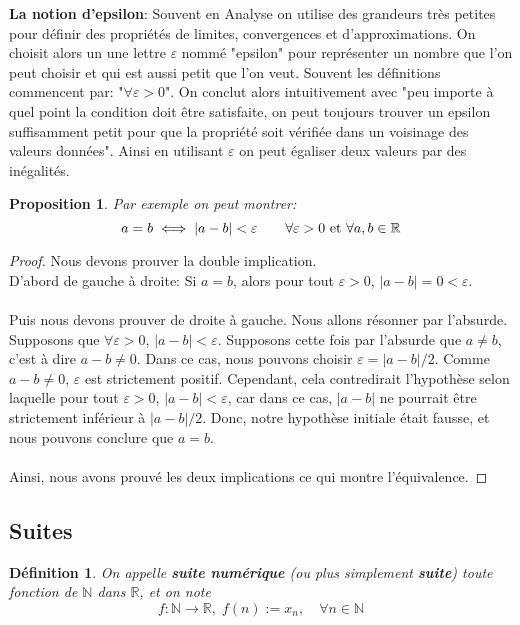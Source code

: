 \documentclass[a4paper, 12pt, french, twoside]{article}
\newtheorem{proposition}[theorem]{Proposition}
\newtheorem{defi}[theorem]{Définition}
\newcommand{\Nn}{{\mathbb{N}}}
\newcommand{\Rr}{{\mathbb{R}}}
\begin{document}
\textbf{La notion d'epsilon}: 
Souvent en Analyse on utilise des grandeurs très petites pour définir des propriétés de limites, convergences et d'approximations. On choisit alors un une lettre $\varepsilon$ nommé "epsilon" pour représenter un nombre que l'on peut choisir et qui est aussi petit que l'on veut. Souvent les définitions commencent par: "$\forall \varepsilon>0$". On conclut alors intuitivement avec "peu importe à quel point la condition doit être satisfaite, on peut toujours trouver un epsilon suffisamment petit pour que la propriété soit vérifiée dans un voisinage des valeurs données". Ainsi en utilisant $\varepsilon$ on peut égaliser deux valeurs par des inégalités. 

\begin{proposition}
    Par exemple on peut montrer:
\begin{equation}
    a=b \iff |a-b|<\varepsilon \qquad \forall \varepsilon>0 {\,\, \rm et\,\, }\forall a,b \in \Rr
\end{equation}
\end{proposition}
\begin{proof}
    Nous devons prouver la double implication. \\D'abord de gauche à droite: Si $a=b$, alors pour tout $\varepsilon>0$, $|a-b|=0<\varepsilon$.
\\ \\Puis nous devons prouver de droite à gauche. Nous allons résonner par l'absurde. Supposons que $\forall \varepsilon>0$, $|a-b|<\varepsilon$. Supposons cette fois par l'absurde que $a\neq b$, c'est à dire $a-b\neq0$. Dans ce cas, nous pouvons choisir $\varepsilon = |a-b|/2$. Comme $a-b\neq 0$, $\varepsilon$ est strictement positif. Cependant, cela contredirait l'hypothèse selon laquelle pour tout $\varepsilon >0$, $|a-b|<\varepsilon$, car dans ce cas, $|a-b|$ ne pourrait être strictement inférieur à $|a-b|/2$. Donc, notre hypothèse initiale était fausse, et nous pouvons conclure que $a=b$.
\\ \\Ainsi, nous avons prouvé les deux implications ce qui montre l'équivalence.
\end{proof}



\subsection{Suites}
\begin{defi}
On appelle \textbf{suite numérique} (ou plus simplement \textbf{suite}) toute fonction de $\Nn$ dans $\Rr$, et on note 
\begin{equation}
    f: \Nn\longrightarrow\Rr,\; f(n):=x_n, \quad \forall n\in \Nn
\end{equation}
\end{defi}
\end{document}
